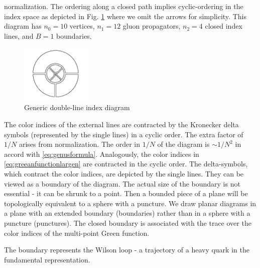 normalization. The ordering along a closed path implies cyclic-ordering in the
index space as depicted in Fig. \ref{fig:genericdoubleline} where we omit the
arrows for simplicity. This diagram has $n_0=10$ vertices, $n_1=12$ gluon
propagators, $n_2=4$ closed index lines, and $B=1$ boundaries.
\begin{figure}[h]
\begin{center}
\includegraphics[width=0.3\textwidth]{Images/genericdoubleline.png}
\end{center}
\caption{Generic double-line index diagram}
\label{fig:genericdoubleline}
\end{figure}
The color indices of the external lines are contracted by the Kronecker delta
symbols (represented by the single lines) in a cyclic order. The extra factor
of $1/N$ arises from normalization. The order in $1/N$ of the diagram is $\sim
1/N^2$ in accord with \eqref{eq:genusformula}. Analogously, the color indices
in \eqref{eq:greeanfunctionlargen} are contracted in the cyclic order. The
delta-symbols, which contract the color indices, are depicted by the single
lines. They can be viewed as a boundary of the diagram. The actual size of
the boundary is not essential - it can be shrunk to a point. Then a bounded
piece of a plane will be topologically equivalent to a  sphere with a puncture.
We draw planar diagrams in a plane with an extended boundary (boundaries)
rather than in a sphere with a  puncture (punctures). The closed boundary is
associated with the trace over the color indices of the multi-point Green
function.
\par The boundary represents the Wilson loop - a trajectory of a heavy quark
in the fundamental representation.
